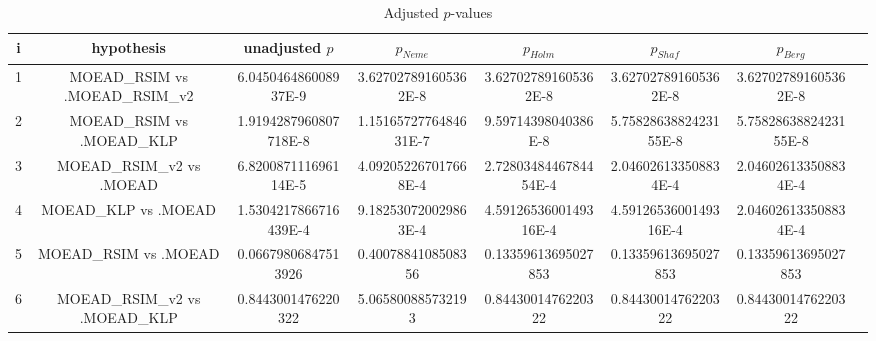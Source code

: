 \documentclass[a4paper,10pt]{article}
\begin{document}
\begin{landscape}
\begin{table}[!htp]
\centering\tiny
\caption{Adjusted $p$-values}
\begin{tabular}{cccccccc}
i&hypothesis&unadjusted $p$&$p_{Neme}$&$p_{Holm}$&$p_{Shaf}$&$p_{Berg}$\\
\hline
1&MOEAD_RSIM vs .MOEAD_RSIM_v2&6.045046486008937E-9&3.627027891605362E-8&3.627027891605362E-8&3.627027891605362E-8&3.627027891605362E-8\\
2&MOEAD_RSIM vs .MOEAD_KLP&1.9194287960807718E-8&1.1516572776484631E-7&9.59714398040386E-8&5.7582863882423155E-8&5.7582863882423155E-8\\
3&MOEAD_RSIM_v2 vs .MOEAD&6.820087111696114E-5&4.092052267017668E-4&2.7280348446784454E-4&2.046026133508834E-4&2.046026133508834E-4\\
4&MOEAD_KLP vs .MOEAD&1.5304217866716439E-4&9.182530720029863E-4&4.5912653600149316E-4&4.5912653600149316E-4&2.046026133508834E-4\\
5&MOEAD_RSIM vs .MOEAD&0.06679806847513926&0.4007884108508356&0.13359613695027853&0.13359613695027853&0.13359613695027853\\
6&MOEAD_RSIM_v2 vs .MOEAD_KLP&0.8443001476220322&5.065800885732193&0.8443001476220322&0.8443001476220322&0.8443001476220322\\
\hline
\end{tabular}
\end{table}

\end{landscape}
\end{document}
